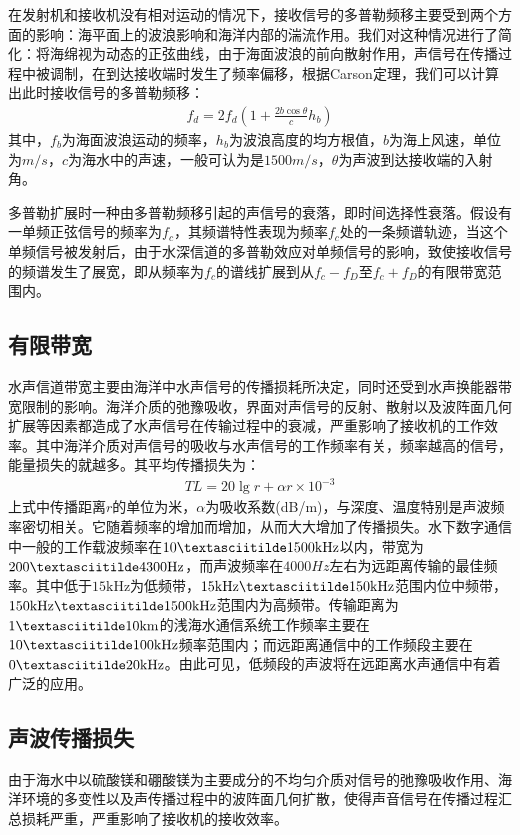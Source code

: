 在发射机和接收机没有相对运动的情况下，接收信号的多普勒频移主要受到两个方面的影响：海平面上的波浪影响和海洋内部的湍流作用。我们对这种情况进行了简化：将海绵视为动态的正弦曲线，由于海面波浪的前向散射作用，声信号在传播过程中被调制，在到达接收端时发生了频率偏移，根据Carson定理，我们可以计算出此时接收信号的多普勒频移：
\begin{eqnarray}
    f_d=2f_d\left(1+\frac{2b\cos\theta}{c}h_b\right)
    \label{equ:2.5}
\end{eqnarray}
其中，$f_b$为海面波浪运动的频率，$h_b$为波浪高度的均方根值，$b$为海上风速，单位为$m/s$，$c$为海水中的声速，一般可认为是$1500m/s$，$\theta$为声波到达接收端的入射角。

多普勒扩展时一种由多普勒频移引起的声信号的衰落，即时间选择性衰落。假设有一单频正弦信号的频率为$f_c$，其频谱特性表现为频率$f_c$处的一条频谱轨迹，当这个单频信号被发射后，由于水深信道的多普勒效应对单频信号的影响，致使接收信号的频谱发生了展宽，即从频率为$f_c$的谱线扩展到从$f_c-f_D$至$f_c+f_D$的有限带宽范围内。
\subsection{有限带宽}
水声信道带宽主要由海洋中水声信号的传播损耗所决定，同时还受到水声换能器带宽限制的影响。海洋介质的弛豫吸收\citep{Essebbar1994}，界面对声信号的反射、散射以及波阵面几何扩展等因素都造成了水声信号在传输过程中的衰减，严重影响了接收机的工作效率。其中海洋介质对声信号的吸收与水声信号的工作频率有关，频率越高的信号，能量损失的就越多。其平均传播损失为：
\begin{eqnarray}
    TL=20\lg r+\alpha r\times10^{-3}
    \label{equ:2.6}
\end{eqnarray}
上式中传播距离$r$的单位为米，$\alpha$为吸收系数(dB/m)，与深度、温度特别是声波频率密切相关。它随着频率的增加而增加，从而大大增加了传播损失。水下数字通信中一般的工作载波频率在$10\textasciitilde
1500\mbox{kHz}$以内，带宽为$200\textasciitilde
4300\mbox{Hz}$，而声波频率在$4000Hz$左右为远距离传输的最佳频率。其中低于$15\mbox{kHz}$为低频带，$15\mbox{kHz}\textasciitilde
150\mbox{kHz}$范围内位中频带，$150\mbox{kHz}\textasciitilde
1500\mbox{kHz}$范围内为高频带。传输距离为$1\textasciitilde10\mbox{km}$的浅海水通信系统工作频率主要在$10\textasciitilde
100\mbox{kHz}$频率范围内；而远距离通信中的工作频段主要在$0\textasciitilde
20\mbox{kHz}$。由此可见，低频段的声波将在远距离水声通信中有着广泛的应用。
\subsection{声波传播损失}
由于海水中以硫酸镁和硼酸镁为主要成分的不均匀介质对信号的弛豫吸收作用、海洋环境的多变性以及声传播过程中的波阵面几何扩散，使得声音信号在传播过程汇总损耗严重，严重影响了接收机的接收效率。

